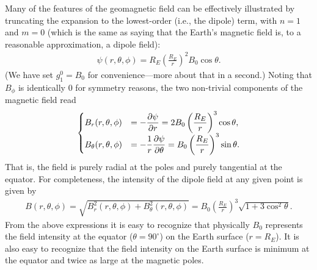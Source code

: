 Many of the features of the geomagnetic field can be effectively illustrated
by truncating the expansion to the lowest-order (i.e., the dipole) term, with
$n = 1$ and $m = 0$ (which is the same as saying that the Earth's magnetic
field is, to a reasonable approximation, a dipole field):
\begin{align}
  \psi(r, \theta, \phi) = R_E \left(\frac{R_E}{r}\right)^{2} B_0 \cos\theta.
\end{align}
(We have set $g_1^0 = B_0$ for convenience---more about that in a second.)
Noting that $B_\phi$ is identically $0$ for symmetry reasons, the two non-trivial
components of the magnetic field read
\begin{align}\label{eq:dipole_field_components}
  \begin{cases}
  B_r(r, \theta, \phi) & = \displaystyle -\pdv{\psi}{r} =
  2 B_0  \left(\frac{R_E}{r}\right)^3 \cos\theta,\\
  B_\theta(r, \theta, \phi) & = \displaystyle -\frac{1}{r}\pdv{\psi}{\theta} =
  B_0 \left(\frac{R_E}{r}\right)^3 \sin\theta.
  \end{cases}
\end{align}
That is, the field is purely radial at the poles and purely tangential at the equator.
For completeness, the intensity of the dipole field at any given point is given by
\begin{align*}
  B(r, \theta, \phi) =
  \sqrt{B_r^2(r, \theta, \phi) + B_\theta^2(r, \theta, \phi)}
  = B_0 \left(\frac{R_E}{r}\right)^3 \sqrt{1 + 3\cos^2\theta}.
\end{align*}
From the above expressions it is easy to recognize that physically $B_0$ represents
the field intensity at the equator ($\theta = 90^\circ$) on the Earth surface
($r = R_E$). It is also easy to recognize that the field intensity on the Earth
surface is minimum at the equator and twice as large at the magnetic poles.


